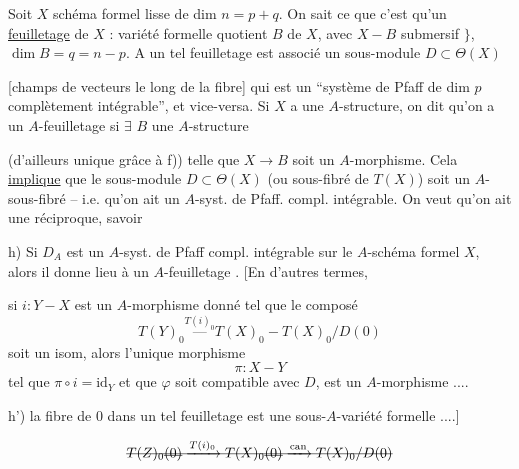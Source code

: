 Soit $X$ schéma formel lisse de dim $n=p+q$. On sait  ce que c'est qu'un \uline{feuilletage}  de $X$ : variété formelle quotient $B$ de $X$, avec $X-B$ submersif $\}$, $\dim B=q=n-p$. A un tel feuilletage est associé un sous-module $D\subset\Theta(X)$

[champs de vecteurs le long de la fibre] qui est un ``système de Pfaff de dim $p$ complètement intégrable'', et vice-versa. Si $X$ a une $A$-structure, on dit qu'on a un $A$-feuilletage si $\exists$  $B$ une $A$-structure

(d'ailleurs unique \unsure{$\}$|)|,} grâce à f)) telle que $X\to B$ soit un $A$-morphisme. Cela \uline{implique} que le sous-module $D\subset\Theta(X)$ (ou sous-fibré de $T(X)$) soit un $A$-sous-fibré -- i.e. qu'on ait un $A$-syst. de Pfaff. compl. intégrable. On veut qu'on ait une réciproque, savoir

h) Si $D_A$ est un $A$-syst. de Pfaff compl. intégrable sur le $A$-schéma formel $X$, alors il donne lieu à un $A$-feuilletage . [En d'autres termes,


si $i:Y-X$ est un $A$-morphisme donné tel que le composé
\[
 T(Y)_0\mathrel{\overset{T(i)_0}{\text{---}}}T(X)_0-T(X)_0/D(0)
\]
soit un isom, alors l'unique morphisme
\[
 \pi:X-Y
\]
tel que $\pi\circ i=\mathrm{id}_Y$ et que $\varphi$ soit compatible avec $D$, est un $A$-morphisme ....

\margin{$\Longleftarrow$} h') la fibre de $0$ dans un tel feuilletage est une sous-$A$-variété formelle ....]


\[
 \deleted{T(Z)_{0}\deleted{(0)}\xrightarrow{T(i)_0}T(X)_{0}\deleted{(0)}\xrightarrow{\mathrm{can}}T(X)_0/D(0)}
\]

